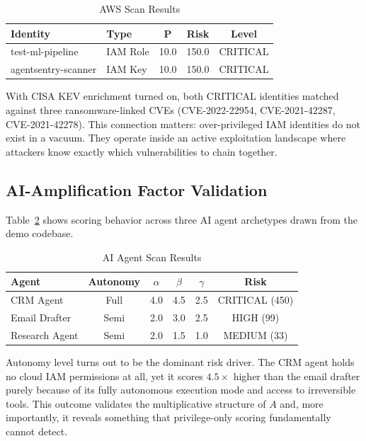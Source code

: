 \documentclass[conference]{IEEEtran}
\begin{document}
\begin{table}[h]
\caption{AWS Scan Results}
\label{tab:aws_results}
\centering
\begin{tabular}{llccc}
\toprule
\textbf{Identity} & \textbf{Type} & \textbf{P} & \textbf{Risk} & \textbf{Level} \\
\midrule
test-ml-pipeline & IAM Role & 10.0 & 150.0 & CRITICAL \\
agentsentry-scanner & IAM Key & 10.0 & 150.0 & CRITICAL \\
\bottomrule
\end{tabular}
\end{table}

With CISA KEV enrichment turned on, both CRITICAL identities matched against
three ransomware-linked CVEs (CVE-2022-22954, CVE-2021-42287,
CVE-2021-42278). This connection matters: over-privileged IAM identities do
not exist in a vacuum. They operate inside an active exploitation landscape
where attackers know exactly which vulnerabilities to chain together.

\subsection{AI-Amplification Factor Validation}

Table~\ref{tab:agent_results} shows scoring behavior across three AI agent
archetypes drawn from the demo codebase.

\begin{table}[h]
\caption{AI Agent Scan Results}
\label{tab:agent_results}
\centering
\begin{tabular}{lccccc}
\toprule
\textbf{Agent} & \textbf{Autonomy} & $\alpha$ & $\beta$ & $\gamma$ & \textbf{Risk} \\
\midrule
CRM Agent & Full & 4.0 & 4.5 & 2.5 & CRITICAL (450) \\
Email Drafter & Semi & 2.0 & 3.0 & 2.5 & HIGH (99) \\
Research Agent & Semi & 2.0 & 1.5 & 1.0 & MEDIUM (33) \\
\bottomrule
\end{tabular}
\end{table}

Autonomy level turns out to be the dominant risk driver. The CRM agent holds no
cloud IAM permissions at all, yet it scores $4.5\times$ higher than the email
drafter purely because of its fully autonomous execution mode and access to
irreversible tools. This outcome validates the multiplicative structure of $A$
and, more importantly, it reveals something that privilege-only scoring
fundamentally cannot detect.
\end{document}
